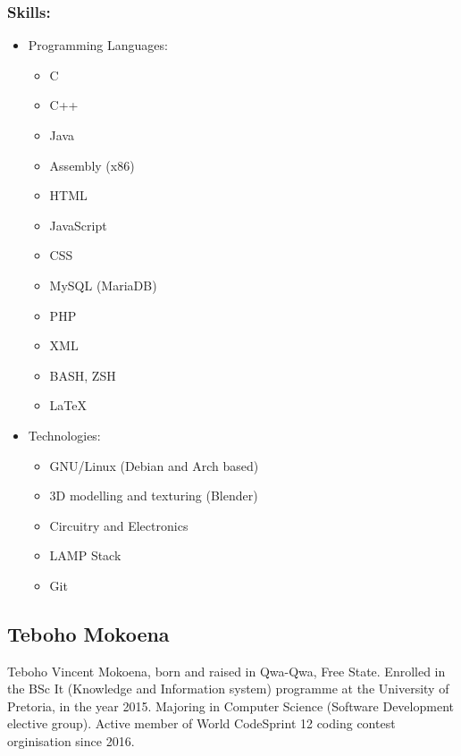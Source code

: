 \documentclass[12pt]{article}
\begin{document}
	\subsubsection{Skills:}
	\begin{itemize}
	\item Programming Languages:
	\begin{itemize}
	\item C
	\item C++
	\item Java
	\item Assembly (x86)
	\item HTML
	\item JavaScript
	\item CSS
	\item MySQL (MariaDB)
	\item PHP
	\item XML
	\item BASH, ZSH
	\item LaTeX
	\end{itemize}
	\item Technologies:
	\begin{itemize}
	\item GNU/Linux (Debian and Arch based)
	\item 3D modelling and texturing (Blender)
	\item Circuitry and Electronics
	\item LAMP Stack
	\item Git
	\end{itemize}
	\end{itemize}
	
	\subsection{Teboho Mokoena}
	Teboho Vincent Mokoena, born and raised in Qwa-Qwa, Free State. Enrolled in the BSc It (Knowledge and Information system) programme at the University of Pretoria, in the year 2015. Majoring in Computer Science (Software Development elective group). Active member of World CodeSprint 12 coding contest orginisation since 2016.
	
\end{document}
